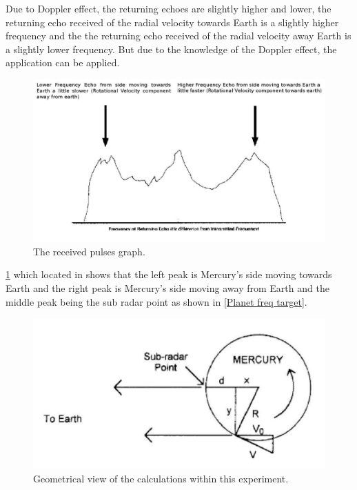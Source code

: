 \documentclass[11pt]{article}
\begin{document}
\begin{multicols}{2}
Due to Doppler effect, the returning echoes are slightly higher and lower, the returning echo received of the radial velocity towards Earth is a slightly higher frequency and the the returning echo received of the radial velocity away Earth is a slightly lower frequency. But due to the knowledge of the Doppler effect, the application can be applied. \\

\begin{figure}[H]
\centering
\includegraphics[scale=0.24]{Graph_Diagram.png}
\caption{The received pulses graph.}
\label{Graph Diagram}
\end{figure}

\cref{Graph Diagram} which located in \cite{LLR.1-2018} shows that the left peak is Mercury's side moving towards Earth and the right peak is Mercury's side moving away from Earth and the middle peak being the sub radar point as shown in \cref{Planet freq target}. \\

\begin{figure}[H]
\centering
\includegraphics[scale=0.35]{d_x_y_Diagram.png}
\caption{Geometrical view of the calculations within this experiment.}
\label{d_x_y Diagram}
\end{figure}


\end{multicols}
\end{document}
